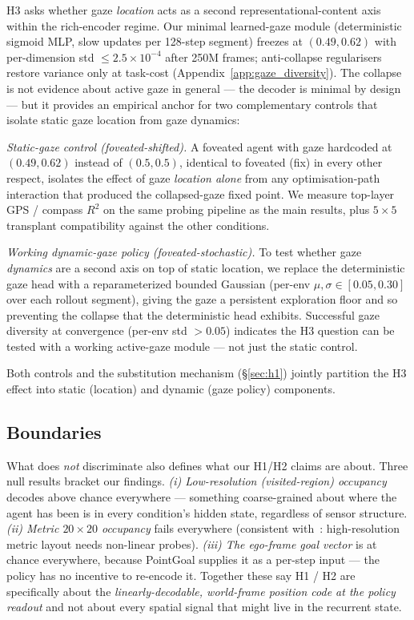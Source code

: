 \documentclass{article}
\newcommand{\hcpending}[1]{{\color{hcpendingcol}#1}}
\begin{document}
H3 asks whether gaze \emph{location} acts as a second representational-content axis within the rich-encoder regime. Our minimal learned-gaze module (deterministic sigmoid MLP, slow updates per 128-step segment) freezes at $(0.49, 0.62)$ with per-dimension std $\leq 2.5\times 10^{-4}$ after 250M frames; anti-collapse regularisers restore variance only at task-cost (Appendix~\ref{app:gaze_diversity}). The collapse is not evidence about active gaze in general --- the decoder is minimal by design --- but it provides an empirical anchor for two complementary controls that isolate static gaze location from gaze dynamics:

\emph{Static-gaze control (foveated-shifted).} \hcpending{A foveated agent with gaze hardcoded at $(0.49, 0.62)$ instead of $(0.5, 0.5)$, identical to foveated (fix) in every other respect, isolates the effect of gaze \emph{location alone} from any optimisation-path interaction that produced the collapsed-gaze fixed point. We measure top-layer GPS / compass $R^2$ on the same probing pipeline as the main results, plus $5{\times}5$ transplant compatibility against the other conditions.}

\emph{Working dynamic-gaze policy (foveated-stochastic).} \hcpending{To test whether gaze \emph{dynamics} are a second axis on top of static location, we replace the deterministic gaze head with a reparameterized bounded Gaussian (per-env $\mu, \sigma \in [0.05, 0.30]$ over each rollout segment), giving the gaze a persistent exploration floor and so preventing the collapse that the deterministic head exhibits. Successful gaze diversity at convergence (per-env std $> 0.05$) indicates the H3 question can be tested with a working active-gaze module --- not just the static control.}

\hcpending{Both controls and the substitution mechanism (§\ref{sec:h1}) jointly partition the H3 effect into static (location) and dynamic (gaze policy) components.}


\subsection{Boundaries}
\label{sec:boundaries}

What does \emph{not} discriminate also defines what our H1/H2 claims are about. Three null results bracket our findings. \emph{(i) Low-resolution (visited-region) occupancy} decodes above chance everywhere --- something coarse-grained about where the agent has been is in every condition's hidden state, regardless of sensor structure. \emph{(ii) Metric $20{\times}20$ occupancy} fails everywhere (consistent with~\citep{ramakrishnan2025space}: high-resolution metric layout needs non-linear probes). \emph{(iii) The ego-frame goal vector} is at chance everywhere, because PointGoal supplies it as a per-step input — the policy has no incentive to re-encode it. Together these say H1 / H2 are specifically about the \emph{linearly-decodable, world-frame position code at the policy readout} and not about every spatial signal that might live in the recurrent state.
\end{document}
